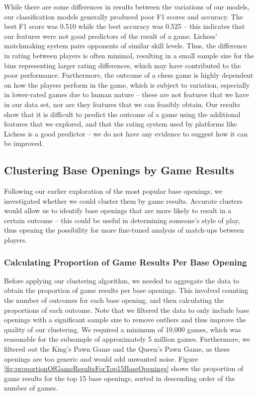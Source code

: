 \documentclass[a4paper, 11pt]{article}
\begin{document}
While there are some differences in results between the variations of our models, our classification models generally produced poor F1 scores and accuracy. The best F1 score was 0.510 while the best accuracy was 0.525 -- this indicates that our features were not good predictors of the result of a game. Lichess' matchmaking system pairs opponents of similar skill levels. Thus, the difference in rating between players is often minimal, resulting in a small sample size for the bins representing larger rating differences, which may have contributed to the poor performance. Furthermore, the outcome of a chess game is highly dependent on how the players perform in the game, which is subject to variation, especially in lower-rated games due to human nature -- these are not features that we have in our data set, nor are they features that we can feasibly obtain. Our results show that it is difficult to predict the outcome of a game using the additional features that we explored, and that the rating system used by platforms like Lichess is a good predictor -- we do not have any evidence to suggest how it can be improved.

\subsection{Clustering Base Openings by Game Results}
Following our earlier exploration of the most popular base openings, we investigated whether we could cluster them by game results. Accurate clusters would allow us to identify base openings that are more likely to result in a certain outcome -- this could be useful in determining someone's style of play, thus opening the possibility for more fine-tuned analysis of match-ups between players.

\subsubsection{Calculating Proportion of Game Results Per Base Opening}
Before applying our clustering algorithm, we needed to aggregate the data to obtain the proportion of game results per base openings. This involved counting the number of outcomes for each base opening, and then calculating the proportions of each outcome. Note that we filtered the data to only include base openings with a significant sample size to remove outliers and thus improve the quality of our clustering. We required a minimum of 10,000 games, which was reasonable for the subsample of approximately 5 million games. Furthermore, we filtered out the King's Pawn Game and the Queen's Pawn Game, as these openings are too generic and would add unwanted noise. Figure \ref{fig:proportionOfGameResultsForTop15BaseOpenings} shows the proportion of game results for the top 15 base openings, sorted in descending order of the number of games.
\end{document}
